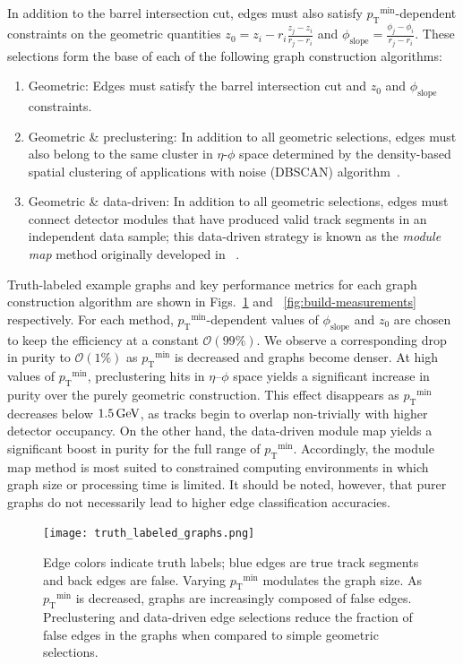 \documentclass[twocolumn]{svjour3}
\newcommand{\pt}{\ensuremath{p_{\mathrm{T}}}\xspace}
\newcommand{\GeV}{\ensuremath{\,\text{Ge\hspace{-.08em}V}}\xspace}
\begin{document}
In addition to the barrel intersection cut, edges must also satisfy $\pt^\mathrm{min}$-dependent constraints on the geometric quantities $z_0=z_i-r_i\frac{z_j-z_i}{r_j-r_i}$ and $\phi_\mathrm{slope}=\frac{\phi_j-\phi_i}{r_j-r_i}$. 
These selections form the base of each of the following graph construction algorithms: 

\begin{enumerate} 
\item Geometric: Edges must satisfy the barrel intersection cut and $z_0$ and $\phi_\mathrm{slope}$ constraints. 
\item Geometric \& preclustering: In addition to all geometric selections, edges must also belong to the same cluster in $\eta$-$\phi$ space determined by the density-based spatial clustering of applications with noise (DBSCAN) algorithm~\cite{dbscan}. 
\item Geometric \& data-driven: In addition to all geometric selections, edges must connect detector modules that have produced valid track segments in an independent data sample; this data-driven strategy is known as the \textit{module map} method originally developed in ~\cite{Biscarat:2021dlj}. 
\end{enumerate}

Truth-labeled example graphs and key performance metrics for each graph construction algorithm are shown in Figs.~\ref{fig:construction} and ~\ref{fig:build-measurements} respectively. 
For each method, $\pt^\mathrm{min}$-dependent values of $\phi_\mathrm{slope}$ and $z_0$ are chosen to keep the efficiency at a constant $\mathcal{O}(99\%)$. 
We observe a corresponding drop in purity to $\mathcal{O}(1\%)$ as $\pt^\mathrm{min}$ is decreased and graphs become denser. 
At high values of $\pt^\mathrm{min}$, preclustering hits in $\eta$--$\phi$ space yields a significant increase in purity over the purely geometric construction. 
This effect disappears as $\pt^\mathrm{min}$ decreases below $1.5\GeV$, as tracks begin to overlap non-trivially with higher detector occupancy. 
On the other hand, the data-driven module map yields a significant boost in purity for the full range of $\pt^\mathrm{min}$. 
Accordingly, the module map method is most suited to constrained computing environments in which graph size or processing time is limited. 
It should be noted, however, that purer graphs do not necessarily lead to higher edge classification accuracies. 

\begin{figure}[!htbp]
\centering
\captionsetup{labelfont=bf}
\texttt{[image: truth\_labeled\_graphs.png]}
\caption{Edge colors indicate truth labels; blue edges are true track segments and back edges are false. 
Varying $\pt^\mathrm{min}$ modulates the graph size. 
As $\pt^\mathrm{min}$ is decreased, graphs are increasingly composed of false edges. 
Preclustering and data-driven edge selections reduce the fraction of false edges in the graphs when compared to simple geometric selections. }
\label{fig:construction} 
\end{figure}
\end{document}
